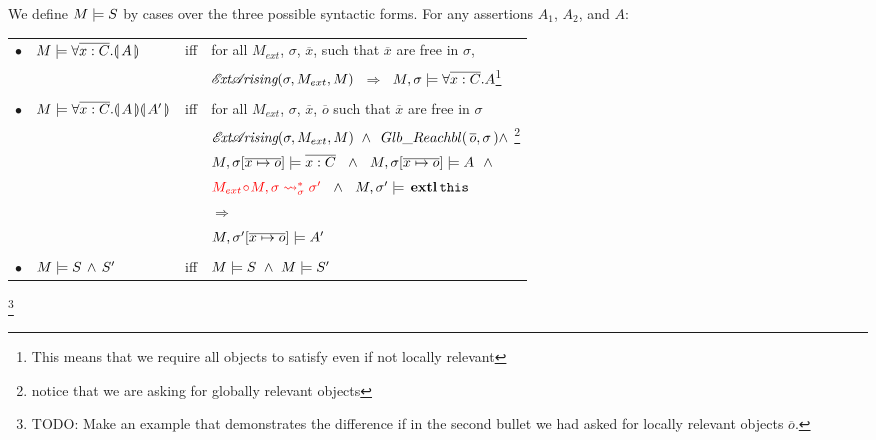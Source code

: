 \begin{definition}%

We define $M \models {S}$ by cases over the three possible syntactic forms.
For any assertions   $A_1$, $A_2$, and $A$: \\

\label{def:necessity-semantics}

\begin{tabular}{l l c l }

$\bullet$ & $M \models \forall {\overline {x:C}}.{\llparenthesis}\, A \,{\rrparenthesis} 	$& iff & 
for all $M_{ext}$, $\sigma$, $\overline{x}$, such that $\overline{x}$  are free in $\sigma$, \\
  & & & $ {\mathcal{E}\!\textit{xt}\mathcal{A}\!\textit{rising}(\sigma, M_{ext}, M)}$ %
$ \ \Longrightarrow \  $  %
{$ M , \sigma \models \forall \overline{x:C}.A$}\footnote{{This means that we require all objects to satisfy even if not locally relevant}}
\\
\\
$\bullet$ & $M \models \forall {\overline {x:C}}.{\llparenthesis}\, A \,{\rrparenthesis}{\llparenthesis}\, A' \,{\rrparenthesis}$& iff & 
for all $M_{ext}$, $\sigma$, $\overline{x}$, $\overline{o}$ such that $\overline{x}$  are free in $\sigma$  \\
& & &
${\extArising{\sigma}{M_{ext}}{M}} \ \wedge\  \GRelevant {\overline o}  \sigma \wedge \ $\footnote{{notice that we are asking for globally relevant objects}}\\
& & & $ \satisfiesA{M}{\sigma[\overline{x\mapsto o}]}{\overline {x:C}}  \ \ \wedge\ \  \satisfiesA{M}{\sigma[\overline{x\mapsto o}]}{A} \ \ \wedge$ \\ 
& & &
$\color{red}M_{ext}\!\circ \!M, \sigma \leadsto^*_{\sigma} \sigma'  \color{black} \ \ \wedge\ \  M, \sigma' \models {{\ensuremath{\, \mathbf{extl}}\, {\texttt{this}}\, }}$ \\
& & & $ \Longrightarrow $ \\
& & & $ M , \sigma'[\overline{x\mapsto o}] \models A' $
\\
\\
$\bullet$ &  $M \models S\, \wedge\, S'$ &   iff   & $\satisfies{M}{S}\ \wedge \ \satisfies{M}{S'}$
\end{tabular} 

 
\end{definition} 


  
  \footnote{{TODO: Make an example that demonstrates the difference if in the second bullet we had asked for locally relevant objects ${\overline o}$.}}
 

